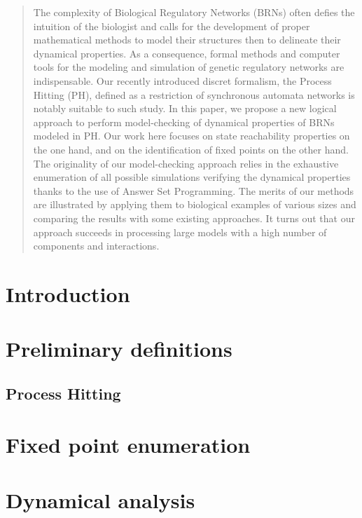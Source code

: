 \documentclass[conference]{IEEEtran}
\begin{document}
\begin{abstract}
The complexity of Biological Regulatory Networks (BRNs) often defies the intuition of the biologist and calls for the development of proper mathematical methods to model their structures then to delineate their dynamical properties. As a consequence, formal methods and computer tools for the modeling and simulation of genetic regulatory networks are indispensable. Our recently introduced discret formalism, the Process Hitting (PH), defined as a restriction of synchronous automata networks is notably suitable to such study.
In this paper, we propose a new logical approach to perform model-checking of dynamical properties of BRNs modeled in PH.
Our work here focuses on state reachability properties on the one hand, and on the identification of fixed points on the other hand. The originality of our model-checking approach relies in the exhaustive enumeration of all possible simulations verifying the dynamical properties thanks to the use of Answer Set Programming.
The merits of our methods are illustrated by applying them to biological examples of various sizes and comparing the results with some existing approaches.
It turns out that our approach succeeds in processing large models with a high number of components and interactions.

\end{abstract}

\IEEEpeerreviewmaketitle



\section{Introduction}


\section{Preliminary definitions}
\label{sec:defs}
\subsection{Process Hitting}


\section{Fixed point enumeration}
\label{sec:fixpoint}


\section{Dynamical analysis}
\label{sec:dynamics}

\end{document}
